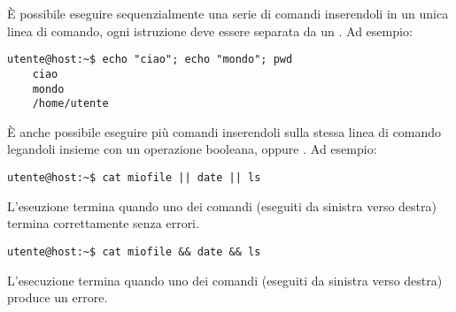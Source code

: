 \documentclass[../main.tex]{subfiles}
\begin{document}
È possibile eseguire sequenzialmente una serie di comandi inserendoli in un unica linea di comando, ogni istruzione deve essere
separata da un \code{;}. Ad esempio:
\begin{lstlisting}[style=bash]
    utente@host:~$ echo "ciao"; echo "mondo"; pwd
    ciao
    mondo
    /home/utente
\end{lstlisting}

È anche possibile eseguire più comandi inserendoli sulla stessa linea di comando legandoli insieme con un operazione booleana, 
oppure . Ad esempio:
\begin{lstlisting}[style=bash]
    utente@host:~$ cat miofile || date || ls
\end{lstlisting}
L'eseuzione termina quando uno dei comandi (eseguiti da sinistra verso destra) termina correttamente senza errori.

\begin{lstlisting}[style=bash]
    utente@host:~$ cat miofile && date && ls
\end{lstlisting}
L'esecuzione termina quando uno dei comandi (eseguiti da sinistra verso destra) produce un errore.
\end{document}
